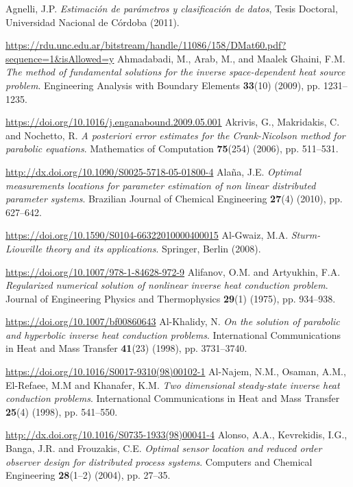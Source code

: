 \begin{thebibliography}{301}  
\singlespace %

 Agnelli, J.P. {\it Estimaci\'on de par\'ametros y clasificaci\'on de datos}, Tesis Doctoral, Universidad Nacional de C\'ordoba (2011).

\url{https://rdu.unc.edu.ar/bitstream/handle/11086/158/DMat60.pdf?sequence=1&isAllowed=y}
%
%
 Ahmadabadi, M., Arab, M., and Maalek Ghaini, F.M. {\it The method of fundamental solutions for the inverse space-dependent heat source problem}. Engineering Analysis with Boundary Elements {\bf 33}(10) (2009), pp. 1231--1235. 

\url{https://doi.org/10.1016/j.enganabound.2009.05.001}
%
%
 Akrivis, G., Makridakis, C. and Nochetto, R. {\it A posteriori error estimates for the Crank-Nicolson method for parabolic equations}. Mathematics of Computation {\bf 75}(254) (2006), pp. 511--531.

\url{http://dx.doi.org/10.1090/S0025-5718-05-01800-4}
%
%
 Ala\~na, J.E. {\it Optimal measurements locations for parameter estimation of non linear distributed parameter systems}. Brazilian Journal of Chemical Engineering {\bf 27}(4) (2010), pp. 627--642.

\url{https://doi.org/10.1590/S0104-66322010000400015}
%
%
 Al-Gwaiz, M.A. {\it Sturm-Liouville theory and its applications}. Springer, Berlin (2008).

\url{https://doi.org/10.1007/978-1-84628-972-9}
%
%
 Alifanov, O.M. and Artyukhin, F.A. {\it Regularized numerical solution of nonlinear inverse heat conduction problem}. Journal of Engineering Physics and Thermophysics {\bf 29}(1) (1975), pp. 934--938.

\url{https://doi.org/10.1007/bf00860643}
%
%
 Al-Khalidy, N. {\it On the solution of parabolic and hyperbolic inverse heat conduction problems}. International Communications in Heat and Mass Transfer {\bf 41}(23) (1998), pp. 3731--3740.

\url{https://doi.org/10.1016/S0017-9310(98)00102-1}
%
%
 Al-Najem, N.M., Osaman, A.M., El-Refaee, M.M and Khanafer, K.M. {\it Two dimensional steady-state inverse heat conduction problems}. International Communications in Heat and Mass Transfer {\bf 25}(4) (1998), pp. 541--550.

\url{http://dx.doi.org/10.1016/S0735-1933(98)00041-4}
%
%
 Alonso, A.A., Kevrekidis, I.G., Banga, J.R. and Frouzakis, C.E. {\it Optimal sensor location and reduced order observer design for distributed process systems}. Computers and Chemical Engineering {\bf 28}(1--2) (2004), pp. 27--35.


\end{thebibliography}
